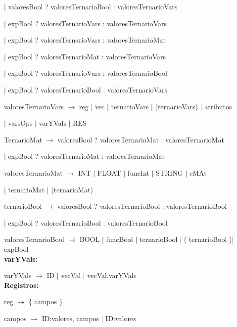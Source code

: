   \hspace{15mm}$|$  valoresBool ? valoresTernarioBool : valoresTernarioVars
  
  \hspace{15mm}$|$  expBool ? valoresTernarioVars : valoresTernarioVars
  
  \hspace{15mm}$|$  expBool ? valoresTernarioVars : valoresTernarioMat 
  
  \hspace{15mm}$|$  expBool ? valoresTernarioMat : valoresTernarioVars
  
  \hspace{15mm}$|$  expBool ? valoresTernarioVars : valoresTernarioBool 
  
  \hspace{15mm}$|$  expBool ? valoresTernarioBool : valoresTernarioVars  
  

  
valoresTernarioVars $\rightarrow$ reg $|$ vec $|$ ternarioVars $|$ (ternarioVars) $|$ atributos 

\hspace{15mm}$|$ varsOps  $|$ varYVals $|$ RES

TernarioMat $\rightarrow$ valoresBool ? valoresTernarioMat : valoresTernarioMat  

\hspace{15mm}$|$ expBool ? valoresTernarioMat : valoresTernarioMat
  
valoresTernarioMat $\rightarrow$ INT $|$ FLOAT $|$ funcInt $|$ STRING $|$ eMAt 

\hspace{15mm}$|$ ternarioMat $|$ (ternarioMat)

ternarioBool $\rightarrow$ valoresBool ? valoresTernarioBool : valoresTernarioBool  

\hspace{15mm}$|$ expBool ? valoresTernarioBool : valoresTernarioBool
  
valoresTernarioBool $\rightarrow$ BOOL $|$ funcBool $|$ ternarioBool $|$ ( ternarioBool )$|$ expBool \\
   

\textbf{varYVals:}

varYVals $\rightarrow$ ID $|$ vecVal $|$ vecVal.varYVals \\


\textbf{Registros:} 

reg $\rightarrow$ $\{$ campos $\}$

campos $\rightarrow$ ID:valores, campos $|$ ID:valores \\


